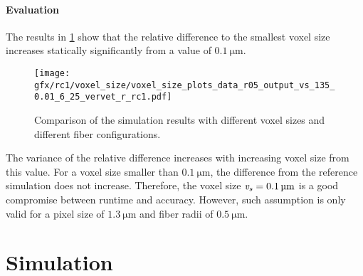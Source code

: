 \paragraph{Evaluation}
%
The results in \cref{fig:voxelsizeNoise} show that the relative difference to the smallest voxel size increases statically significantly from a value of $\SI{0.1}{\micro\meter}$.
%
\begin{figure}[!t]
\centering
\texttt{[image: gfx/rc1/voxel\_size/voxel\_size\_plots\_data\_r05\_output\_vs\_135\_0.01\_6\_25\_vervet\_r\_rc1.pdf]}
\caption[]{Comparison of the simulation results with different voxel sizes and different fiber configurations.}
\label{fig:voxelsizeNoise}
\end{figure}
%
The variance of the relative difference increases with increasing voxel size from this value.
For a voxel size smaller than $\SI{0.1}{\micro\meter}$, the difference from the reference simulation does not increase.
Therefore, the voxel size $\textnormal{$\mathit{v_{s}}$} = \SI{0.1}{\micro\meter}$ is a good compromise between runtime and accuracy.
However, such assumption is only valid for a pixel size of $\SI{1.3}{\micro\meter}$ and fiber radii of $\SI{0.5}{\micro\meter}$.
%
%
%
\section{Simulation}
%
